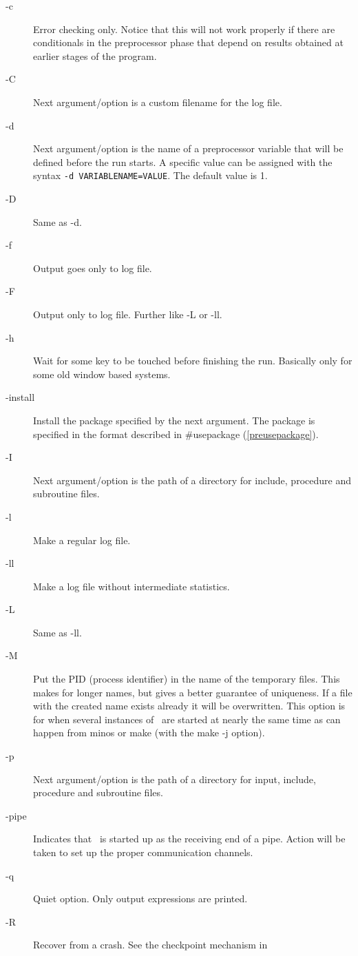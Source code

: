 \begin{description}
\item[-c] Error checking only. Notice that this will not work 
     properly if there are conditionals in the preprocessor phase that 
     depend on results obtained at earlier stages of the program.
\item[-C] Next argument/option is a custom filename for the log file.
\item[-d] Next argument/option is the name of a preprocessor 
     variable that will be defined before the run starts. A specific value can be assigned with the
	 syntax {\tt -d VARIABLENAME=VALUE}. The default value is 1.
\item[-D] Same as -d.
\item[-f] Output goes only to log file.
\item[-F] Output only to log file. Further like -L or -ll.
\item[-h] Wait for some key to be touched before finishing the run.
     Basically only for some old window based systems.
\item[-install] Install the package specified by the 
     next argument. The package is specified in the format described in 
     \#usepackage (\ref{preusepackage}).
\item[-I] Next argument/option is the path of a directory for 
     include, procedure and subroutine files.
\item[-l] Make a regular log file.
\item[-ll] Make a log file without intermediate statistics.
\item[-L] Same as -ll.
\item[-M] Put the PID (process identifier) in the name of the temporary 
     files. This makes for longer names, but gives a better guarantee of 
     uniqueness. If a file with the created name exists already it will be 
     overwritten. This option is for when several instances of \FORM\ are 
     started at nearly the same time as can happen from minos or make (with 
     the make -j option).
\item[-p] Next argument/option is the path of a directory for 
     input, include, procedure and subroutine files.
\item[-{pipe}] Indicates that \FORM\ is started up as the receiving 
     end of a pipe. Action will be taken to set up the proper communication 
     channels.
\item[-q] Quiet option. Only output expressions are printed.
\item[-R] Recover from a crash. See the checkpoint mechanism in 

\end{description}
